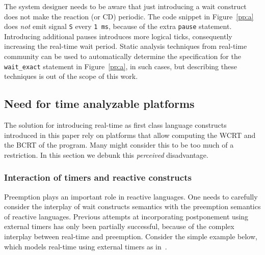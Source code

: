 The system designer needs to be aware that just introducing a wait
construct does not make the reaction (or CD) periodic. The code snippet
in Figure~\ref{pp:a} does \textit{not} emit signal \texttt{S} every
\texttt{1 ms}, because of the extra \texttt{pause}
statement. Introducing additional pauses introduces more logical ticks,
consequently increasing the real-time wait period. Static analysis
techniques from real-time community can be used to automatically
determine the specification for the \texttt{wait\_exact} statement in
Figure~\ref{pp:a}, in such cases, but describing these techniques is out
of the scope of this work.

\subsection{Need for time analyzable platforms}
\label{sec:need-time-analyzable}

The solution for introducing real-time as first class language
constructs introduced in this paper rely on platforms that allow
computing the WCRT and the BCRT of the program. Many might consider this
to be too much of a restriction. In this section we debunk this
\textit{perceived} disadvantage.

\subsubsection{Interaction of timers and reactive constructs}
\label{sec:inter-timers-react}


Preemption plays an important role in reactive languages. One needs to
carefully consider the interplay of wait constructs semantics with the
preemption semantics of reactive languages. Previous attempts at
incorporating postponement using external timers has only been partially
successful, because of the complex interplay between real-time and
preemption. Consider the simple example below, which models real-time
using external timers as in~\cite{rsh94}.

